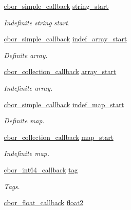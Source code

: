 \begin{DoxyCompactItemize}
\hyperlink{callbacks_8h_a414becb6eeb6a2c4fcb4d657b17d3113}{cbor\-\_\-simple\-\_\-callback} \hyperlink{structcbor__callbacks_ac5a3ff3cd57f469460c13598d14eb2eb}{string\-\_\-start}
\begin{DoxyCompactList}\small\item\em Indefinite string start. \end{DoxyCompactList}\item 
\hyperlink{callbacks_8h_a414becb6eeb6a2c4fcb4d657b17d3113}{cbor\-\_\-simple\-\_\-callback} \hyperlink{structcbor__callbacks_a5831fd6bd9372b04a8f65db1e1967713}{indef\-\_\-array\-\_\-start}
\begin{DoxyCompactList}\small\item\em Definite array. \end{DoxyCompactList}\item 
\hyperlink{callbacks_8h_a1760fbd902567c34cb788b6d891ec8df}{cbor\-\_\-collection\-\_\-callback} \hyperlink{structcbor__callbacks_affebd3296749cdc0d564a3b9cae7a4e4}{array\-\_\-start}
\begin{DoxyCompactList}\small\item\em Indefinite array. \end{DoxyCompactList}\item 
\hyperlink{callbacks_8h_a414becb6eeb6a2c4fcb4d657b17d3113}{cbor\-\_\-simple\-\_\-callback} \hyperlink{structcbor__callbacks_ab989b168f43559f404d87508bdd0ddc8}{indef\-\_\-map\-\_\-start}
\begin{DoxyCompactList}\small\item\em Definite map. \end{DoxyCompactList}\item 
\hyperlink{callbacks_8h_a1760fbd902567c34cb788b6d891ec8df}{cbor\-\_\-collection\-\_\-callback} \hyperlink{structcbor__callbacks_ac833a2232c624936d7444612e47e8a20}{map\-\_\-start}
\begin{DoxyCompactList}\small\item\em Indefinite map. \end{DoxyCompactList}\item 
\hyperlink{callbacks_8h_a1ba7b7117064e3b6d13c1a1414b325b1}{cbor\-\_\-int64\-\_\-callback} \hyperlink{structcbor__callbacks_ab5a727d5b11a7f2558cf811908f92e70}{tag}
\begin{DoxyCompactList}\small\item\em Tags. \end{DoxyCompactList}\item 
\hyperlink{callbacks_8h_a70c40374bfa3cc289a975e8d3d31eb74}{cbor\-\_\-float\-\_\-callback} \hyperlink{structcbor__callbacks_ab1f4ab3a5bf0cf2a6418b8cb28877652}{float2}

\end{DoxyCompactItemize}
